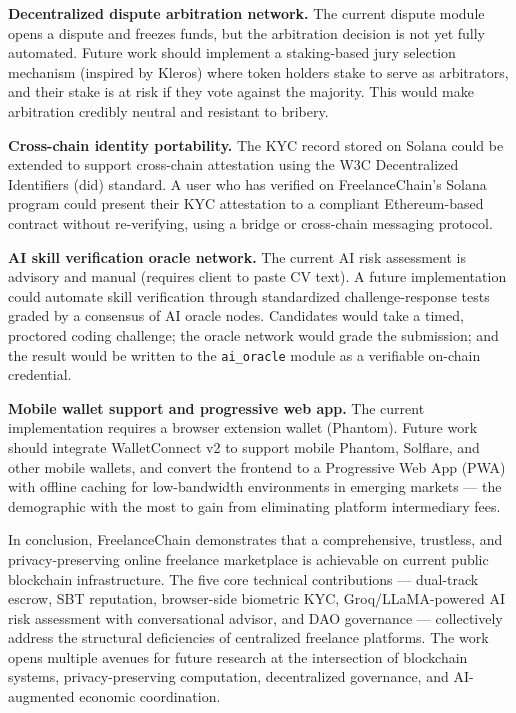 \textbf{Decentralized dispute arbitration network.} The current dispute module opens a dispute and freezes funds, but the arbitration decision is not yet fully automated. Future work should implement a staking-based jury selection mechanism (inspired by Kleros) where token holders stake to serve as arbitrators, and their stake is at risk if they vote against the majority. This would make arbitration credibly neutral and resistant to bribery.

\textbf{Cross-chain identity portability.} The KYC record stored on Solana could be extended to support cross-chain attestation using the W3C Decentralized Identifiers (\gls{did}) standard. A user who has verified on FreelanceChain's Solana program could present their KYC attestation to a compliant Ethereum-based contract without re-verifying, using a bridge or cross-chain messaging protocol.

\textbf{AI skill verification oracle network.} The current AI risk assessment is advisory and manual (requires client to paste CV text). A future implementation could automate skill verification through standardized challenge-response tests graded by a consensus of AI oracle nodes. Candidates would take a timed, proctored coding challenge; the oracle network would grade the submission; and the result would be written to the \texttt{ai\_oracle} module as a verifiable on-chain credential.

\textbf{Mobile wallet support and progressive web app.} The current implementation requires a browser extension wallet (Phantom). Future work should integrate WalletConnect v2 to support mobile Phantom, Solflare, and other mobile wallets, and convert the frontend to a Progressive Web App (PWA) with offline caching for low-bandwidth environments in emerging markets --- the demographic with the most to gain from eliminating platform intermediary fees.

In conclusion, FreelanceChain demonstrates that a comprehensive, trustless, and privacy-preserving online freelance marketplace is achievable on current public blockchain infrastructure. The five core technical contributions --- dual-track escrow, SBT reputation, browser-side biometric KYC, Groq/LLaMA-powered AI risk assessment with conversational advisor, and DAO governance --- collectively address the structural deficiencies of centralized freelance platforms. The work opens multiple avenues for future research at the intersection of blockchain systems, privacy-preserving computation, decentralized governance, and AI-augmented economic coordination.
